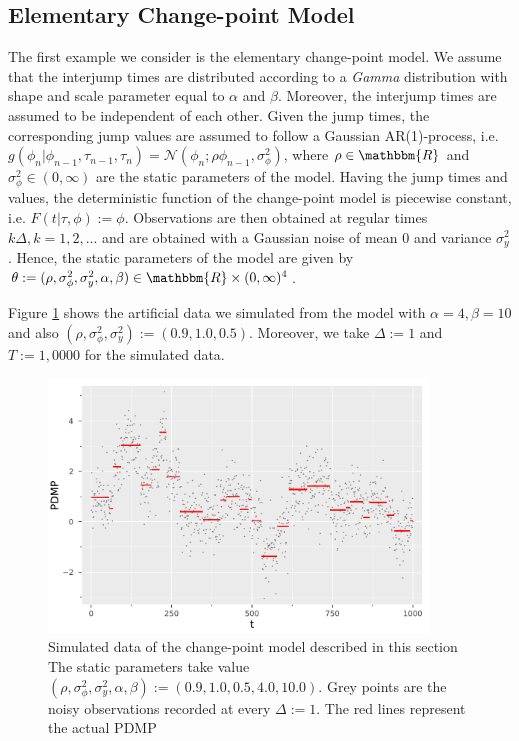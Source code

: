 \documentclass[12pt,a4paper]{article}
\begin{document}
\subsection{Elementary Change-point Model}
The first example we consider is the elementary change-point model. We assume that the interjump times are distributed according to a \textit{Gamma} distribution with shape and scale parameter equal to \(\alpha\) and \(\beta\). Moreover, the interjump times are assumed to be independent of each other. Given the jump times, the corresponding jump values are assumed to follow a Gaussian AR(1)-process, i.e. \(g(\phi_n|\phi_{n-1},\tau_{n-1},\tau_n) = \mathcal{N}(\phi_n;\rho\phi_{n-1},\sigma_{\phi}^2)\), where \(\rho \in \mathbbm{R}\) and \(\sigma_{\phi}^2 \in (0,\infty)\) are the static parameters of the model. Having the jump times and values, the deterministic function of the change-point model is piecewise constant, i.e. \(F(t|\tau,\phi):= \phi\). Observations are then obtained at regular times \(k\Delta, k= 1,2,...\) and are obtained with a Gaussian noise of mean \(0\) and variance \(\sigma_y^2\). Hence, the static parameters of the model are given by \(\theta:= (\rho,\sigma_\phi^2,\sigma_y^2,\alpha,\beta) \in \mathbbm{R}\times (0,\infty)^4\). 

Figure \ref{Fig:Changpoint Data} shows the artificial data we simulated from the model with \(\alpha=4,\beta=10\) and also \((\rho,\sigma_\phi^2,\sigma^2_y):= (0.9,1.0,0.5)\). Moreover, we take \(\Delta := 1\) and \(T:=1,0000\) for the simulated data.
\begin{figure}[t!] 
    \centering
    \includegraphics[width=0.9\textwidth]{CP_data.pdf}
    \caption{Simulated data of the change-point model described in this section The static parameters take value \((\rho,\sigma_\phi^2,\sigma_y^2,\alpha,\beta):=(0.9,1.0,0.5,4.0,10.0)\). Grey points are the noisy observations recorded at every \(\Delta := 1\). The red lines represent the actual PDMP}
    \label{Fig:Changpoint Data}
\end{figure}
\end{document}
